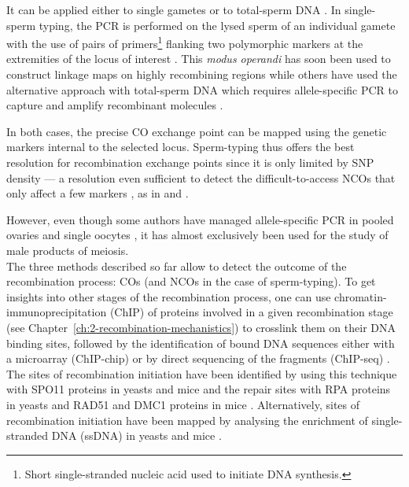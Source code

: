 It can be applied either to single gametes or to total-sperm DNA \citep[reviewed in][]{arnheim2003hot}.
In single-sperm typing, the PCR is performed on the lysed sperm of an individual gamete with the use of pairs of primers\footnote{Short single-stranded nucleic acid used to initiate DNA synthesis.} flanking two polymorphic markers at the extremities of the locus of interest \citep{cui1989singlesperm,lien1993simple}.
This \textit{modus operandi} has soon been used to construct linkage maps on highly recombining regions \citep{schmitt1994multipoint,lien2000evidence,cullen2002highresolution} while others \citep{tusie-luna1995gene, jeffreys1998highresolution, jeffreys2001intensely, guillon2002initiation} have used the alternative approach with total-sperm DNA which requires allele-specific PCR to capture and amplify recombinant molecules \citep{wu1989allelespecific}.

In both cases, the precise CO exchange point can be mapped using the genetic markers internal to the selected locus.
Sperm-typing thus offers the best resolution for recombination exchange points since it is only limited by SNP density — a resolution even sufficient to detect the difficult-to-access NCOs that only affect a few markers \citep{hellenthal2006insights}, as in \citet{tusie-luna1995gene} and \citet{guillon2002initiation}.

However, even though some authors have managed allele-specific PCR in pooled ovaries \citep{guillon2005crossover, baudat2007cis} and single oocytes \citep{cole2014mouse}, it has almost exclusively been used for the study of male products of meiosis.\\

The three methods described so far allow to detect the outcome of the recombination process: COs (and NCOs in the case of sperm-typing).
To get insights into other stages of the recombination process, one can use chromatin-immunoprecipitation (ChIP) of proteins involved in a given recombination stage (see Chapter~\ref{ch:2-recombination-mechanistics}) to crosslink them on their DNA binding sites, followed by the identification of bound DNA sequences either with a microarray (ChIP-chip) or by direct sequencing of the fragments (ChIP-seq) \citep[reviewed in][]{park2009chipseq}. 
The sites of recombination initiation have been identified by using this technique with SPO11 proteins in yeasts \citep{gerton2000global,mieczkowski2007loss,pan2011hierarchical} and mice \citep{lange2016landscape} and the repair sites with RPA proteins in yeasts \citep{borde2009histone} and RAD51 and DMC1 proteins in mice \citep{smagulova2011genomewide,brick2012genetic}.
Alternatively, sites of recombination initiation have been mapped by analysing the enrichment of single-stranded DNA (ssDNA) in yeasts \citep{blitzblau2007mapping,buhler2007mapping} and mice \citep{khil2012sensitive}.

